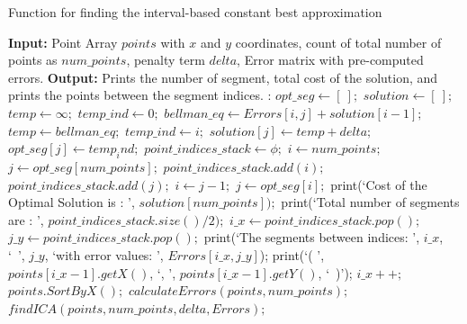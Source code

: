 \documentclass{article}
\begin{document}
\begin{algorithm}
\caption{Function for finding the interval-based constant best approximation}
\label{alg:findICA}
\begin{algorithmic}[1]
\State \textbf{Input:} Point Array $points$ with $x$ and $y$ coordinates, count of total number of points as $num\_points$, penalty term $delta$, Error matrix with pre-computed errors.
\State \textbf{Output:} Prints the number of segment, total cost of the solution, and prints the points between the segment indices.
:
\State $opt\_seg \leftarrow [\ ];$
\State $solution \leftarrow [\ ];$
\State $temp\leftarrow \infty;$
\State $temp\_ind\leftarrow 0;$
 \State $bellman\_eq\leftarrow Errors[i, j] + solution[i - 1];$
 \State $temp \leftarrow bellman\_eq;$ 
 \State $temp\_ind \leftarrow i;$
 \EndIf
\EndFor
\State $solution[j] \leftarrow temp + delta;$
\State $opt\_seg[j] \leftarrow temp_ind;$
\EndFor
\State $point\_indices\_stack \leftarrow \phi;$
\State $i \leftarrow num\_points;$
\State $j \leftarrow opt\_seg[num\_points];$
\State $point\_indices\_stack.add(i);$
\State $point\_indices\_stack.add(j);$
\State $i \leftarrow j-1;$
\State $j\leftarrow opt\_seg[i];$
\EndWhile
\State print(\lq Cost of the Optimal Solution is : \rq, $solution[num\_points]);$
\State print(\lq Total number of segments are : \rq, $point\_indices\_stack.size()/2);$
\State $i\_x \leftarrow point\_indices\_stack.pop();$
\State $j\_y \leftarrow point\_indices\_stack.pop();$
\State print(\lq The segments between indices: \rq, $i\_x$, \lq\ \rq, $j\_y$, \lq with error values: \rq, $Errors[i\_x,j\_y]$);
\State print(\lq( \rq, $points[i\_x-1].getX()$, \lq, \rq, $points[i\_x-1].getY()$, \lq\ )\rq);
\State $i\_x++;$
\EndWhile
\EndWhile
\EndFunction
\State $points.SortByX();$ 
\State $calculateErrors(points,num\_points);$
\State $findICA(points, num\_points,delta,Errors);$
\end{algorithmic}
\end{algorithm}
\end{document}
